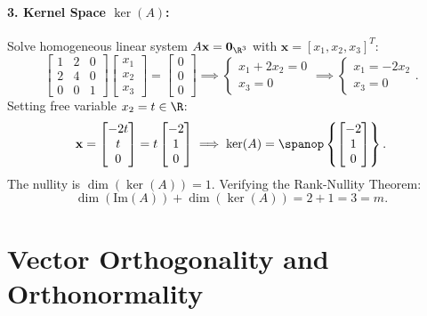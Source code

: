 \begin{example}
\paragraph{3. Kernel Space $\ker(A)$:}
Solve homogeneous linear system $A\mathbf{x} = \mathbf{0}_{\R^3}$ with $\mathbf{x} = [x_1, x_2, x_3]^T$:
\begin{equation}
    \begin{bmatrix} 1 & 2 & 0 \\ 2 & 4 & 0 \\ 0 & 0 & 1 \end{bmatrix} \begin{bmatrix} x_1 \\ x_2 \\ x_3 \end{bmatrix} = \begin{bmatrix} 0 \\ 0 \\ 0 \end{bmatrix} \implies \begin{cases} x_1 + 2x_2 = 0 \\ x_3 = 0 \end{cases} \implies \begin{cases} x_1 = -2x_2 \\ x_3 = 0 \end{cases}.
\end{equation}
Setting free variable $x_2 = t \in \R$:
\begin{equation}
    \mathbf{x} = \begin{bmatrix} -2t \\ t \\ 0 \end{bmatrix} = t \begin{bmatrix} -2 \\ 1 \\ 0 \end{bmatrix} \implies \ker(A) = \spanop\left\{ \begin{bmatrix} -2 \\ 1 \\ 0 \end{bmatrix} \right\}.
\end{equation}
The nullity is $\dim(\ker(A)) = 1$. Verifying the Rank-Nullity Theorem:
\begin{equation}
    \dim(\mathrm{Im}(A)) + \dim(\ker(A)) = 2 + 1 = 3 = m.
\end{equation}
\end{example}

\FloatBarrier
\section{Vector Orthogonality and Orthonormality}

